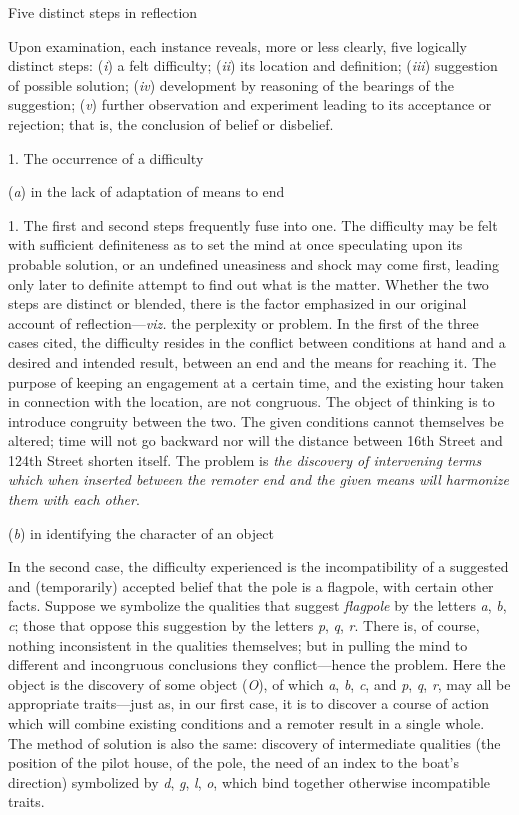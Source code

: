 \documentclass[letterpaper]{book}
\begin{document}
Five distinct steps in reflection

Upon examination, each instance reveals, more or less clearly, five
logically distinct steps: (\emph{i}) a felt difficulty; (\emph{ii}) its
location and definition; (\emph{iii}) suggestion of possible solution;
(\emph{iv}) development by reasoning of the bearings of the suggestion;
(\emph{v}) further observation and experiment leading to its acceptance
or rejection; that is, the conclusion of belief or disbelief.

1. The occurrence of a difficulty

(\emph{a}) in the lack of adaptation of means to end

1. The first and second steps frequently fuse into one. The difficulty
may be felt with sufficient definiteness as to set the mind at once
speculating upon its probable solution, or an undefined uneasiness and
shock may come first, leading only later to definite attempt to find out
what is the matter. Whether the two steps are distinct or blended, there
is the factor emphasized in our original account of
reflection---\emph{viz.} the perplexity or problem. In the first of the
three cases cited, the difficulty resides in the conflict between
conditions at hand and a desired and intended result, between an end and
the means for reaching it. The purpose of keeping an engagement at a
certain time, and the existing hour taken in connection with the
location, are not congruous. The object of thinking is to introduce
congruity between the two. The given conditions cannot themselves be
altered; time will not go backward nor will the distance between 16th
Street and 124th Street shorten itself. The problem is \emph{the
discovery of intervening terms which when inserted between the remoter
end and the given means will harmonize them with each
other}.



(\emph{b}) in identifying the character of an object

In the second case, the difficulty experienced is the incompatibility of
a suggested and (temporarily) accepted belief that the pole is a
flagpole, with certain other facts. Suppose we symbolize the qualities
that suggest \emph{flagpole} by the letters \emph{a}, \emph{b},
\emph{c}; those that oppose this suggestion by the letters \emph{p},
\emph{q}, \emph{r}. There is, of course, nothing inconsistent in the
qualities themselves; but in pulling the mind to different and
incongruous conclusions they conflict---hence the problem. Here the
object is the discovery of some object (\emph{O}), of which \emph{a},
\emph{b}, \emph{c}, and \emph{p}, \emph{q}, \emph{r}, may all be
appropriate traits---just as, in our first case, it is to discover a
course of action which will combine existing conditions and a remoter
result in a single whole. The method of solution is also the same:
discovery of intermediate qualities (the position of the pilot house, of
the pole, the need of an index to the boat's direction) symbolized by
\emph{d}, \emph{g}, \emph{l}, \emph{o}, which bind together otherwise
incompatible traits.
\end{document}

